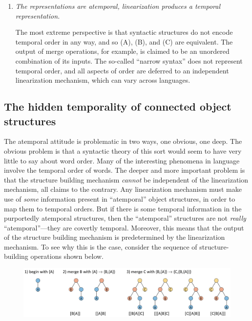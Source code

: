 \begin{enumerate}
\item \textit{The representations are atemporal, linearization produces a temporal representation.}

  The most extreme perspective is that syntactic structures do not encode temporal order in any way, and so (A), (B), and (C) are equivalent. The output of merge operations, for example, is claimed to be an unordered combination of its inputs. The so-called “narrow syntax” does not represent temporal order, and all aspects of order are deferred to an independent linearization mechanism, which can vary across languages. 
\end{enumerate}


\subsection{The hidden temporality of connected object structures}

The atemporal attitude is problematic in two ways, one obvious, one deep. The obvious problem is that a syntactic theory of this sort would seem to have very little to say about word order. Many of the interesting phenomena in language involve the temporal order of words. The deeper and more important problem is that the structure building mechanism \textit{cannot} be independent of the linearization mechanism, all claims to the contrary. Any linearization mechanism must make use of \textit{some} information present in “atemporal” object structures, in order to map them to temporal orders. But if there is some temporal information in the purportedly atemporal structures, then the “atemporal” structures are not \textit{really} “atemporal”—they are covertly temporal. Moreover, this means that the output of the structure building mechanism is predetermined by the linearization mechanism. To see why this is the  case, consider the sequence of structure-building operations shown below.

  
\begin{figure}
\includegraphics[width=\textwidth]{figures/Tilsen-img42.png}
\caption{\missingcaption}
\label{fig:3:14}
\end{figure}
 

